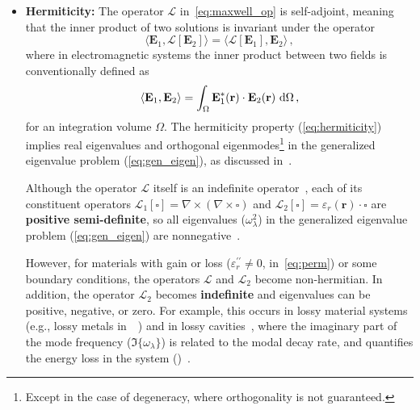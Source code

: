\begin{itemize}
              \item \textbf{Hermiticity:} The operator $\mathcal{L}$ in~\eqref{eq:maxwell_op}  is self-adjoint,
              meaning that the inner product of two solutions is invariant under the
              operator
                           \begin{equation}\label{eq:hermiticity}
                             \langle \mathbf{E}_1, \mathcal{L}[\mathbf{E}_2] \rangle = \langle \mathcal{L}[\mathbf{E}_1], \mathbf{E}_2 \rangle\,,
                         \end{equation}
              where in electromagnetic systems the inner product between two fields is conventionally defined as
                         \begin{equation}
                             \langle \mathbf{E}_1, \mathbf{E}_2 \rangle = \int_\Omega \mathbf{E}_1^*(\mathbf{r}) \cdot \mathbf{E}_2(\mathbf{r}) \, \mathop{}\!\text{d}\Omega\,,
                         \end{equation}
              for an integration volume $\Omega$.
              The hermiticity property (\eqref{eq:hermiticity}) implies real eigenvalues and orthogonal eigenmodes\footnote{Except in
              the case of degeneracy, where orthogonality is not guaranteed.} in the generalized eigenvalue problem (\eqref{eq:gen_eigen}), as discussed
              in~\cite{phot_crys}.
              
              Although the operator $\mathcal{L}$ itself is an indefinite operator~\cite{phot_crys}, each of its constituent operators $\mathcal{L}_1[\square]=\nabla \times (\nabla \times \square)$ and $\mathcal{L}_2[\square]=\varepsilon_r(\mathbf{r}) \cdot \square$ are \textbf{positive semi-definite}, so all
              eigenvalues ($\omega_\lambda^2$) in the generalized eigenvalue problem (\eqref{eq:gen_eigen}) are nonnegative~\cite{phot_crys}. 
              
              However, for materials with
              gain or loss
              ($\varepsilon_r^{\prime\prime} \neq 0$, in~\eqref{eq:perm}) or some boundary conditions, the operators $\mathcal{L}$ and $\mathcal{L}_2$ become non-hermitian. In addition, the operator $\mathcal{L}_2$ becomes \textbf{indefinite} and eigenvalues can be positive, negative, or zero. For example, this occurs in lossy
              material systems
              (e.g., lossy metals in~~\cite{ownpub0}) and in lossy cavities~\cite{ownpub4},
              where the imaginary part of the mode frequency ($\Im\{\omega_\lambda\}$) is
              related to the modal decay rate, and quantifies the energy loss in the system ()~\cite{ownpub0}.


\end{itemize}
